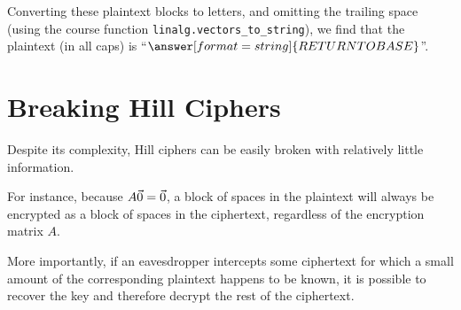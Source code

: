\documentclass{ximera}
\begin{document}
\begin{example}
  Converting these plaintext blocks to letters, and omitting the trailing space (using the course function \texttt{linalg.vectors\_to\_string}),
  we find that the plaintext (in all caps) is ``$\answer[format=string]{RETURN TO BASE}$''.
\end{example}

\section*{Breaking Hill Ciphers}

Despite its complexity, Hill ciphers can be easily broken with relatively little information. 

For
instance, because $A\vec{0}=\vec{0}$, a block of spaces in the plaintext
will always be encrypted as a block of spaces in the ciphertext,
regardless of the encryption matrix $A$. 

More importantly, if an eavesdropper intercepts
some ciphertext for which a small amount of the corresponding
plaintext happens to be known, it is possible to recover
the key and therefore decrypt the rest of the ciphertext. 

\begin{center}
\end{center}
\end{document}
